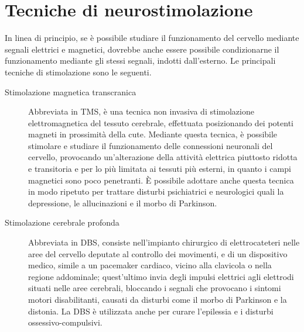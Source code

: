 \documentclass{report}
\numberwithin{equation}{section}
\numberwithin{figure}{section}
\begin{document}
\section{Tecniche di neurostimolazione}
In linea di principio, se è possibile studiare il funzionamento del cervello mediante segnali elettrici e magnetici, dovrebbe anche essere possibile condizionarne il funzionamento mediante gli stessi segnali, indotti dall'esterno. Le principali tecniche di stimolazione sono le seguenti.
\begin{description}
    \item[Stimolazione magnetica transcranica] Abbreviata in TMS, è una tecnica non invasiva di stimolazione elettromagnetica del tessuto cerebrale, effettuata posizionando dei potenti magneti in prossimità della cute. Mediante questa tecnica, è possibile stimolare e studiare il funzionamento delle connessioni neuronali del cervello, provocando un'alterazione della attività elettrica piuttosto ridotta e transitoria e per lo più limitata ai tessuti più esterni, in quanto i campi magnetici sono poco penetranti. È possibile adottare anche questa tecnica in modo ripetuto per trattare disturbi psichiatrici e neurologici quali la depressione, le allucinazioni e il morbo di Parkinson.
    \item[Stimolazione cerebrale profonda] Abbreviata in DBS, consiste nell'impianto chirurgico di elettrocateteri nelle aree del cervello deputate al controllo dei movimenti, e di un dispositivo medico, simile a un pacemaker cardiaco, vicino alla clavicola o nella regione addominale; quest'ultimo invia degli impulsi elettrici agli elettrodi situati nelle aree cerebrali, bloccando i segnali che provocano i sintomi motori disabilitanti, causati da disturbi come il morbo di Parkinson e la distonia. La DBS è utilizzata anche per curare l'epilessia e i disturbi ossessivo-compulsivi.
\end{description}
\end{document}
